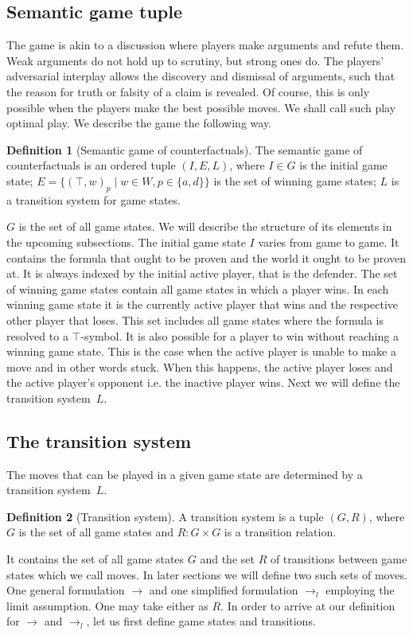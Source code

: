 \documentclass[a4paper,american]{paper}
\theoremstyle{definition}\newtheorem{definition}{Definition}
\begin{document}
\subsection{Semantic game tuple}
The game is akin to a discussion where players make arguments and refute them. Weak arguments do not hold up to scrutiny, but strong ones do. The players' adversarial interplay allows the discovery and dismissal of arguments, such that the reason for truth or falsity of a claim is revealed. Of course, this is only possible when the players make the best possible moves. We shall call such play optimal play. We describe the game the following way.
\begin{definition}[Semantic game of counterfactuals]
The semantic game of counterfactuals is an ordered tuple $(I, E, L)$, where $I\in G$ is the initial game state; $E=\{(\top ,w)_p \mid w\in W, p\in\{ a,d\}\}$ is the set of winning game states; $L$ is a transition system for game states.
\end{definition}

$G$ is the set of all game states. We will describe the structure of its elements in the upcoming subsections. The initial game state $I$ varies from game to game. It contains the formula that ought to be proven and the world it ought to be proven at. It is always indexed by the initial active player, that is the defender. The set of winning game states contain all game states in which a player wins. In each winning game state it is the currently active player that wins and the respective other player that loses. This set includes all game states where the formula is resolved to a $\top$-symbol. It is also possible for a player to win without reaching a winning game state. This is the case when the active player is unable to make a move and in other words stuck. When this happens, the active player loses and the active player's opponent i.e. the inactive player wins. Next we will define the transition system~$L$.

\subsection{The transition system}
The moves that can be played in a given game state are determined by a transition system~$L$.
\begin{definition}[Transition system]
A transition system is a tuple $(G,R)$, where $G$ is the set of all game states and $R: G\times G$ is a transition relation.
\end{definition}
It contains the set of all game states $G$ and the set $R$ of transitions between game states which we call moves. In later sections we will define two such sets of moves. One general formulation $\rightarrow$ and one simplified formulation $\rightarrow_l$ employing the limit assumption. One may take either as $R$. In order to arrive at our definition for $\rightarrow$ and $\rightarrow_l$, let us first define game states and transitions.
\end{document}
